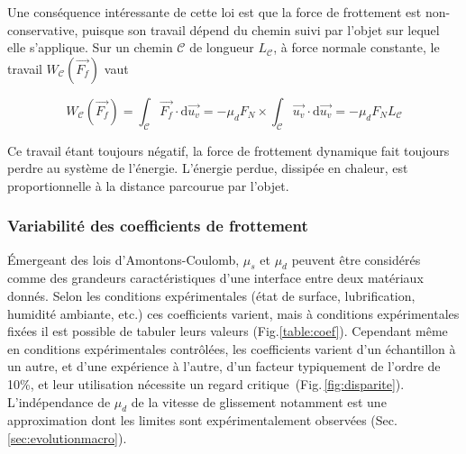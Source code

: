 Une conséquence intéressante de cette loi est que la force de frottement est non-conservative, puisque son travail dépend du chemin suivi par l'objet sur lequel elle s'applique. Sur un chemin $\mathscr{C}$ de longueur $L_{\mathscr{C}}$,  à force normale constante, le travail $W_{\mathscr{C}}(\vec{F_f})$ vaut


\begin{equation}
W_{\mathscr{C}}(\vec{F_f})
= \int_{\mathscr{C}}\vec{F_f}\cdot\mathrm{d}\vec{u_v}
= -\mu_dF_N
\times \int_{\mathscr{C}}\vec{u_v}\cdot\mathrm{d}\vec{u_v} 
= -\mu_dF_NL_{\mathscr{C}}
\label{eq:dissip}
\end{equation}

Ce travail étant toujours négatif, la force de frottement dynamique fait toujours perdre au système de l'énergie. L'énergie perdue, dissipée en chaleur, est proportionnelle à la distance parcourue par l'objet.




\subsubsection{Variabilité des coefficients de frottement}

Émergeant des lois d'Amontons-Coulomb, $\mu_s$ et $\mu_d$ peuvent être considérés comme des grandeurs caractéristiques d'une interface entre deux matériaux donnés. Selon les conditions expérimentales (état de surface, lubrification, humidité ambiante, etc.) ces coefficients varient, mais à conditions expérimentales fixées il est possible de tabuler leurs valeurs (Fig.\ref{table:coef}). Cependant même en conditions expérimentales contrôlées, les coefficients varient d'un échantillon à un autre, et d'une expérience à l'autre, d'un facteur typiquement de l'ordre de 10\%, et leur utilisation nécessite un regard critique\,\cite{ben-david_static_2011, blau_significance_2001, czichos_multilaboratory_1987} (Fig.\,\ref{fig:disparite}). L'indépendance de $\mu_d$ de la vitesse de glissement notamment est une approximation dont les limites sont expérimentalement observées (Sec.\,\ref{sec:evolutionmacro}).



